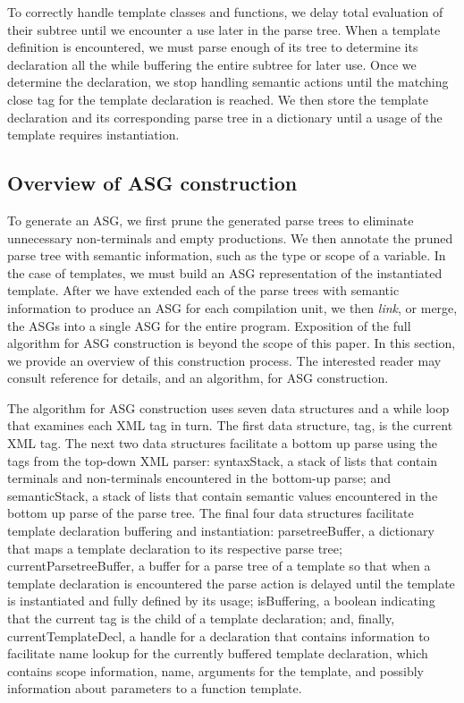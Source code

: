 To correctly handle template classes and functions, we delay total evaluation
of their subtree until we encounter a use later in the parse tree.
When a template definition is encountered, we must parse enough of its
tree to determine its declaration all the while buffering the entire subtree
for later use.  Once we determine the declaration, we stop handling semantic
actions until the matching close tag for the template declaration is reached.
We then store the template declaration and its corresponding parse tree
in a dictionary until a usage of the template requires instantiation.



\subsection{Overview of ASG construction}

To generate an ASG, we first prune 
the generated parse trees to eliminate unnecessary
non-terminals and empty productions. We then annotate the
pruned parse tree with semantic information, such as the type
or scope of a variable. In the case of templates, we must
build an ASG representation of the instantiated template.
After we have extended each of the parse trees with semantic
information to produce an ASG for each compilation unit,
we then {\em link}, or merge, the ASGs into a single
ASG for the entire program.
Exposition of the full algorithm for ASG construction is
beyond the scope of this paper. In this section,
we provide an overview of this construction  process.
The interested reader may consult reference \cite{duffythesis}
for details, and an algorithm, for ASG construction.


The algorithm for ASG construction uses seven data structures and a while
loop that examines each XML tag in turn. 
The first data structure, {\sf tag}, is the current XML tag.
The next two data structures facilitate a bottom up parse using
the tags from the top-down XML parser:
{\sf syntaxStack}, a stack of lists that contain terminals and
non-terminals encountered in the bottom-up parse;
and {\sf semanticStack}, a stack of lists that contain semantic values
encountered in the bottom up parse of the parse tree.
The final four data structures facilitate template declaration buffering
and instantiation:
{\sf parsetreeBuffer}, a dictionary that maps a template declaration
to its respective parse tree;
{\sf currentParsetreeBuffer}, a buffer for a parse tree of a template so
that when a template declaration is encountered the parse action is delayed 
until the template is instantiated and fully defined by its usage;
{\sf isBuffering}, a boolean indicating that the current tag
is the child of a template declaration;
and, finally,
{\sf currentTemplateDecl}, a handle for a declaration that
contains information to facilitate name lookup for the currently buffered
template declaration, which contains scope information, name, 
arguments for the template, and possibly information about parameters
to a function template.
